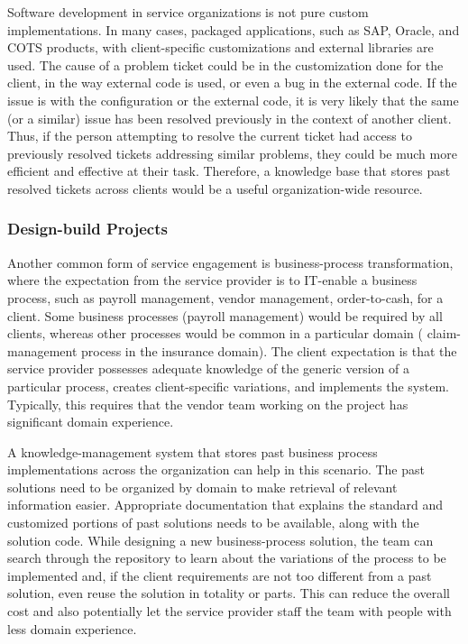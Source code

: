 Software development in service organizations is not pure custom
implementations. In many cases, packaged applications, such as SAP, Oracle, and
COTS products, with client-specific customizations and external libraries are
used. The cause of a problem ticket could be in the customization done for the
client, in the way external code is used, or even a bug in the external code. If
the issue is with the configuration or the external code, it is very likely that
the same (or a similar) issue has been resolved previously in the context of
another client. Thus, if the person attempting to resolve the current ticket had
access to previously resolved tickets addressing similar problems, they could be
much more efficient and effective at their task.  Therefore, a knowledge base
that stores past resolved tickets across clients would be a useful
organization-wide resource.

\subsubsection{Design-build Projects}

Another common form of service engagement is business-process transformation,
where the expectation from the service provider is to IT-enable a business
process, such as payroll management, vendor management, order-to-cash, for a
client. Some business processes (\eg payroll management) would be required by
all clients, whereas other processes would be common in a particular domain (\eg
claim-management process in the insurance domain).  The client expectation is
that the service provider possesses adequate knowledge of the generic version of
a particular process, creates client-specific variations, and implements the
system. Typically, this requires that the vendor team working on the project has
significant domain experience.

A knowledge-management system that stores past business process implementations
across the organization can help in this scenario. The past solutions need to be
organized by domain to make retrieval of relevant information
easier. Appropriate documentation that explains the standard and customized
portions of past solutions needs to be available, along with the solution
code. While designing a new business-process solution, the team can search
through the repository to learn about the variations of the process to be
implemented and, if the client requirements are not too different from a past
solution, even reuse the solution in totality or parts. This can reduce the
overall cost and also potentially let the service provider staff the team with
people with less domain experience.

